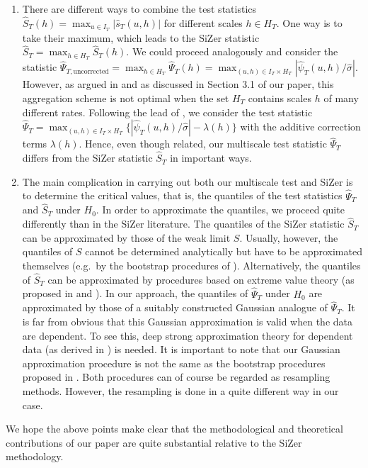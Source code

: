 \documentclass[a4paper,12pt]{article}
\begin{document}
\begin{enumerate}[label=(\roman*), leftmargin=0.8cm]
\item There are different ways to combine the test statistics $\widehat{S}_T(h) = \max_{u \in I_T} |\widehat{s}_T(u,h)|$ for different scales $h \in H_T$. One way is to take their maximum, which leads to the SiZer statistic $\widehat{S}_T = \max_{h \in H_T} \widehat{S}_T(h)$. We could proceed analogously and consider the statistic $\widehat{\Psi}_{T,\text{uncorrected}} = \max_{h \in H_T} \widehat{\Psi}_T(h) = \max_{(u,h) \in I_T \times H_T} |\widehat{\psi}_T(u,h)/\widehat{\sigma}|$. However, as argued in \cite{DuembgenSpokoiny2001} and as discussed in Section 3.1 of our paper, this aggregation scheme is not optimal when the set $H_T$ contains scales $h$ of many different rates. Following the lead of \cite{DuembgenSpokoiny2001}, we consider the test statistic $\widehat{\Psi}_T = \max_{(u,h) \in I_T \times H_T} \{ |\widehat{\psi}_T(u,h)/\widehat{\sigma}| - \lambda(h) \}$ with the additive correction terms $\lambda(h)$. Hence, even though related, our multiscale test statistic $\widehat{\Psi}_T$ differs from the SiZer statistic $\widehat{S}_T$ in important ways. 

\item The main complication in carrying out both our multiscale test and SiZer is to determine the critical values, that is, the quantiles of the test statistics $\widehat{\Psi}_T$ and $\widehat{S}_T$ under $H_0$. In order to approximate the quantiles, we proceed quite differently than in the SiZer literature. The quantiles of the SiZer statistic $\widehat{S}_T$ can be approximated by those of the weak limit $S$. Usually, however, the quantiles of $S$ cannot be determined analytically but have to be approximated themselves (e.g.\ by the bootstrap procedures of \cite{ChaudhuriMarron1999, ChaudhuriMarron2000}). Alternatively, the quantiles of $\widehat{S}_T$ can be approximated by procedures based on extreme value theory (as proposed in \cite{HannigMarron2006} and \cite{ParkHannigKang2009}). In our approach, the quantiles of $\widehat{\Psi}_T$ under $H_0$ are approximated by those of a suitably constructed Gaussian analogue of $\widehat{\Psi}_T$. It is far from obvious that this Gaussian approximation is valid when the data are dependent. To see this, deep strong approximation theory for dependent data (as derived in \cite{BerkesLiuWu2014}) is needed. It is important to note that our Gaussian approximation procedure is not the same as the bootstrap procedures proposed in \cite{ChaudhuriMarron1999, ChaudhuriMarron2000}. Both procedures can of course be regarded as resampling methods. However, the resampling is done in a quite different way in our case.

\end{enumerate}
We hope the above points make clear that the methodological and theoretical contributions of our paper are quite substantial relative to the SiZer methodology. 
\vspace{10pt}
\end{document}
